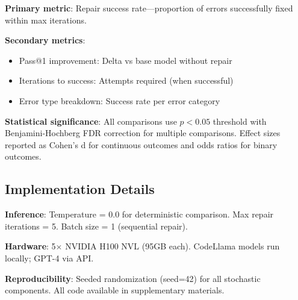\textbf{Primary metric}: Repair success rate---proportion of errors successfully fixed within max iterations.

\textbf{Secondary metrics}:
\begin{itemize}
    \item Pass@1 improvement: Delta vs base model without repair
    \item Iterations to success: Attempts required (when successful)
    \item Error type breakdown: Success rate per error category
\end{itemize}

\textbf{Statistical significance}: All comparisons use $p < 0.05$ threshold with Benjamini-Hochberg FDR correction for multiple comparisons. Effect sizes reported as Cohen's d for continuous outcomes and odds ratios for binary outcomes.

\subsection{Implementation Details}

\textbf{Inference}: Temperature = 0.0 for deterministic comparison. Max repair iterations = 5. Batch size = 1 (sequential repair).

\textbf{Hardware}: 5$\times$ NVIDIA H100 NVL (95GB each). CodeLlama models run locally; GPT-4 via API.

\textbf{Reproducibility}: Seeded randomization (seed=42) for all stochastic components. All code available in supplementary materials.
